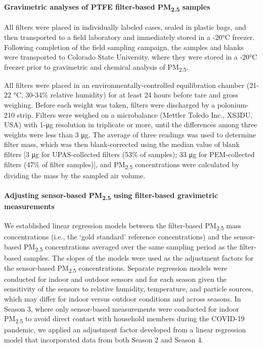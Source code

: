 \documentclass[
  letterpaper,
  DIV=11,
  numbers=noendperiod]{scrartcl}
\let\oldparagraph\paragraph
\renewcommand{\paragraph}[1]{\oldparagraph{#1}\mbox{}}
\begin{document}
\hypertarget{gravimetric-analyses-of-ptfe-filter-based-pm2.5-samples}{%
\paragraph{\texorpdfstring{Gravimetric analyses of PTFE filter-based
PM\textsubscript{2.5}
samples}{Gravimetric analyses of PTFE filter-based PM2.5 samples}}\label{gravimetric-analyses-of-ptfe-filter-based-pm2.5-samples}}

All filters were placed in individually labeled cases, sealed in plastic
bags, and then transported to a field laboratory and immediately stored
in a -20°C freezer. Following completion of the field sampling campaign,
the samples and blanks were transported to Colorado State University,
where they were stored in a -20°C freezer prior to gravimetric and
chemical analysis of PM\textsubscript{2.5}.

All filters were placed in an environmentally-controlled equilibration
chamber (21-22 °C, 30-34\% relative humidity) for at least 24 hours
before tare and gross weighing. Before each weight was taken, filters
were discharged by a polonium-210 strip. Filters were weighed on a
microbalance (Mettler Toledo Inc., XS3DU, USA) with 1-μg resolution in
triplicate or more, until the differences among three weights were less
than 3 μg. The average of three readings was used to determine filter
mass, which was then blank-corrected using the median value of blank
filters {[}3 μg for UPAS-collected filters (53\% of samples); 33 μg for
PEM-collected filters (47\% of filter samples){]}, and
PM\textsubscript{2.5} concentrations were calculated by dividing the
mass by the sampled air volume.

\hypertarget{adjusting-sensor-based-pm2.5-using-filter-based-gravimetric-measurements}{%
\paragraph{\texorpdfstring{Adjusting sensor-based PM\textsubscript{2.5}
using filter-based gravimetric
measurements}{Adjusting sensor-based PM2.5 using filter-based gravimetric measurements}}\label{adjusting-sensor-based-pm2.5-using-filter-based-gravimetric-measurements}}

We established linear regression models between the filter-based
PM\textsubscript{2.5} mass concentrations (i.e., the `gold standard'
reference concentrations) and the sensor-based PM\textsubscript{2.5}
concentrations averaged over the same sampling period as the
filter-based samples. The slopes of the models were used as the
adjustment factors for the sensor-based PM\textsubscript{2.5}
concentrations. Separate regression models were conducted for indoor and
outdoor sensors and for each season given the sensitivity of the sensors
to relative humidity, temperature, and particle sources, which may
differ for indoor versus outdoor conditions and across seasons. In
Season 3, where only sensor-based measurements were conducted for indoor
PM\textsubscript{2.5} to avoid direct contact with household members
during the COVID-19 pandemic, we applied an adjustment factor developed
from a linear regression model that incorporated data from both Season 2
and Season 4.
\end{document}
